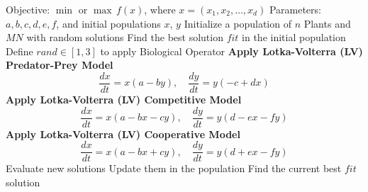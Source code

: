\begin{algorithm}
    \caption{Continuous Mycorrhiza Optimization Algorithm (CMOA)}
    \begin{algorithmic}[1]
        \Require Objective: $\min$ or $\max \, f(x)$, where $x = (x_1, x_2, \dots, x_d)$
        \Require Parameters: $a, b, c, d, e, f$, and initial populations $x$, $y$
        \State Initialize a population of $n$ Plants and $MN$ with random solutions
        \State Find the best solution $fit$ in the initial population
        \State Define $rand \in [1, 3]$ to apply Biological Operator
        \State \textbf{Apply Lotka-Volterra (LV) Predator-Prey Model}
        \[
            \frac{dx}{dt} = x(a - by), \quad \frac{dy}{dt} = y(-c + dx)
        \]
        \State \textbf{Apply Lotka-Volterra (LV) Competitive Model}
        \[
            \frac{dx}{dt} = x(a - bx - cy), \quad \frac{dy}{dt} = y(d - ex - fy)
        \]
        \Else
        \State \textbf{Apply Lotka-Volterra (LV) Cooperative Model}
        \[
            \frac{dx}{dt} = x(a - bx + cy), \quad \frac{dy}{dt} = y(d + ex - fy)
        \]
        \EndIf
        \State Evaluate new solutions
        \State Update them in the population
        \EndIf
        \EndFor
        \State Find the current best $fit$ solution
        \EndWhile
    \end{algorithmic}
\end{algorithm}

